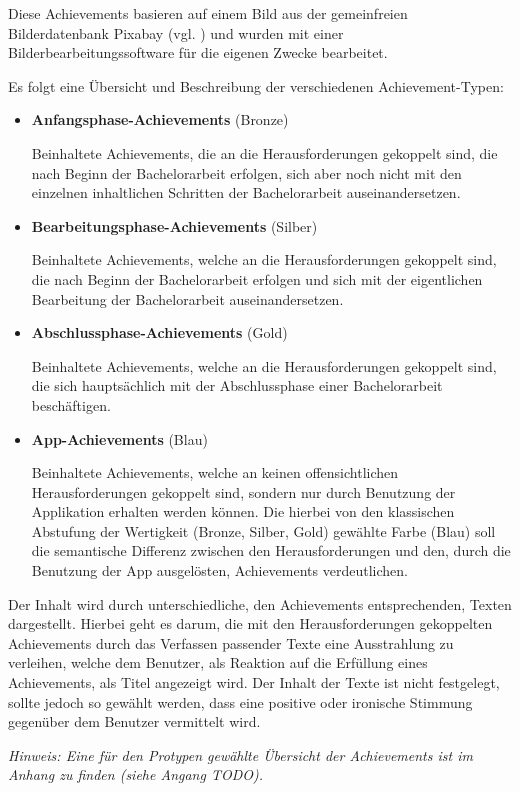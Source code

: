 \documentclass[bibliography=totoc,listof=totoc,BCOR=5mm,DIV=12,oneside]{scrbook}
\begin{document}
\par \bigskip Diese Achievements basieren auf einem Bild aus der gemeinfreien Bilderdatenbank Pixabay (vgl. \citep{PixabayAchievement}) und wurden mit einer Bilderbearbeitungssoftware für die eigenen Zwecke bearbeitet.

\par \bigskip Es folgt eine Übersicht und Beschreibung der verschiedenen Achievement-Typen:
\begin{itemize}
\item \textbf{Anfangsphase-Achievements} (Bronze)
\par Beinhaltete Achievements, die an die Herausforderungen gekoppelt sind, die nach Beginn der Bachelorarbeit erfolgen, sich aber noch nicht mit den einzelnen inhaltlichen Schritten der Bachelorarbeit auseinandersetzen.
\item \textbf{Bearbeitungsphase-Achievements} (Silber)
\par Beinhaltete Achievements, welche an die Herausforderungen gekoppelt sind, die nach Beginn der Bachelorarbeit erfolgen und sich mit der eigentlichen Bearbeitung der Bachelorarbeit auseinandersetzen.
\item \textbf{Abschlussphase-Achievements} (Gold)
\par Beinhaltete Achievements, welche an die Herausforderungen gekoppelt sind, die sich hauptsächlich mit der Abschlussphase einer Bachelorarbeit beschäftigen.
\item \textbf{App-Achievements} (Blau)
\par Beinhaltete Achievements, welche an keinen offensichtlichen Herausforderungen gekoppelt sind, sondern nur durch Benutzung der Applikation erhalten werden können. Die hierbei von den klassischen Abstufung der Wertigkeit (Bronze, Silber, Gold) gewählte Farbe (Blau) soll die semantische Differenz zwischen den Herausforderungen und den, durch die Benutzung der App ausgelösten, Achievements verdeutlichen. 
\end{itemize} 

\par \bigskip Der Inhalt wird durch unterschiedliche, den Achievements entsprechenden, Texten dargestellt. Hierbei geht es darum, die mit den Herausforderungen gekoppelten Achievements durch das Verfassen passender Texte eine Ausstrahlung zu verleihen, welche dem Benutzer, als Reaktion auf die Erfüllung eines Achievements, als Titel angezeigt wird. Der Inhalt der Texte ist nicht festgelegt, sollte jedoch so gewählt werden, dass eine positive oder ironische Stimmung gegenüber dem Benutzer vermittelt wird.
\par \bigskip \textit{Hinweis: Eine für den Protypen gewählte Übersicht der Achievements ist im Anhang zu finden (siehe Angang TODO).}
\end{document}
